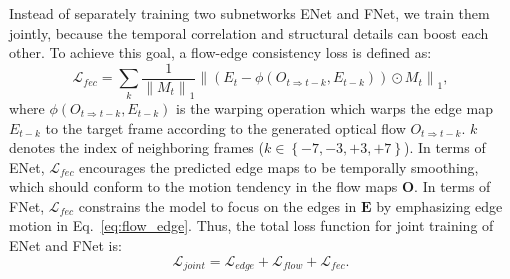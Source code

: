 Instead of separately training two subnetworks ENet and FNet, we train them jointly, because the temporal correlation and structural details can boost each other.
To achieve this goal, a flow-edge consistency loss is defined as:
%
\begin{equation}
	\label{eq:flow_edge}
	\mathcal{L}_{fec}=\sum_{k}\frac{1}{\left\|M_{t} \right\|_1}\left\|(E_{t}-\phi(O_{t\Rightarrow t-k},E_{t-k}))\odot M_{t}\right\|_1,
\end{equation}
where $\phi(O_{t\Rightarrow t-k},E_{t-k})$ is the warping operation which warps the edge map $E_{t-k}$ to the target frame according to the generated optical flow $O_{t\Rightarrow t-k}$.
$k$ denotes the index of neighboring frames ($k\in \left\{-7,-3,+3,+7 \right\}$). 
In terms of ENet, $\mathcal{L}_{fec}$ encourages the predicted edge maps to be temporally smoothing, which should conform to the motion tendency in the flow maps $\boldsymbol{O}$. 
In terms of FNet, $\mathcal{L}_{fec}$ constrains the model to focus on the edges in $\boldsymbol{E}$ by emphasizing edge motion in Eq.~\ref{eq:flow_edge}. 
Thus, the total loss function for joint training of ENet and FNet is:
\begin{equation}
	\label{eq:flow}
	\mathcal{L}_{joint}=\mathcal{L}_{edge}+\mathcal{L}_{flow}+ \mathcal{L}_{fec}.
\end{equation}









